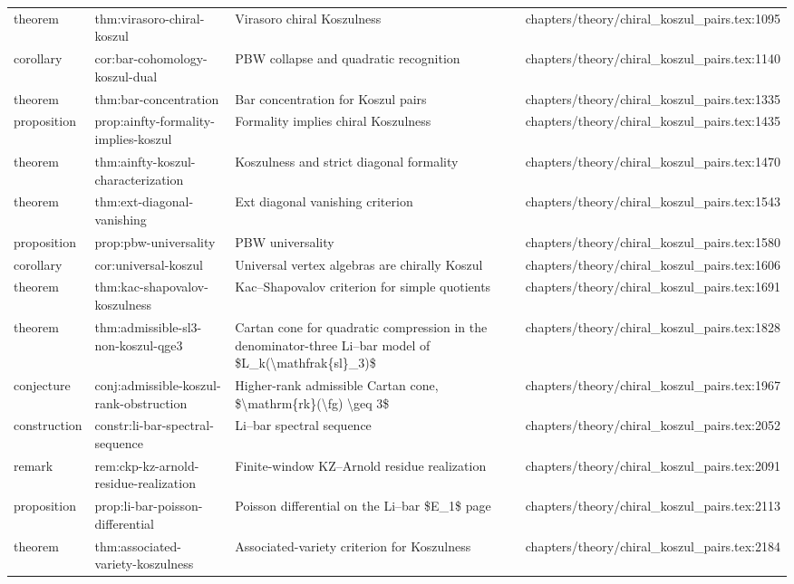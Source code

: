 \documentclass[11pt]{article}
\begin{document}
\begin{longtable}{L{0.10\textwidth}L{0.26\textwidth}L{0.42\textwidth}L{0.22\textwidth}}
theorem & thm:virasoro-chiral-koszul & Virasoro chiral Koszulness & chapters/theory/chiral\_koszul\_pairs.tex:1095\\
corollary & cor:bar-cohomology-koszul-dual & PBW collapse and quadratic recognition & chapters/theory/chiral\_koszul\_pairs.tex:1140\\
theorem & thm:bar-concentration & Bar concentration for Koszul pairs & chapters/theory/chiral\_koszul\_pairs.tex:1335\\
proposition & prop:ainfty-formality-implies-koszul & Formality implies chiral Koszulness & chapters/theory/chiral\_koszul\_pairs.tex:1435\\
theorem & thm:ainfty-koszul-characterization & Koszulness and strict diagonal formality & chapters/theory/chiral\_koszul\_pairs.tex:1470\\
theorem & thm:ext-diagonal-vanishing & Ext diagonal vanishing criterion & chapters/theory/chiral\_koszul\_pairs.tex:1543\\
proposition & prop:pbw-universality & PBW universality & chapters/theory/chiral\_koszul\_pairs.tex:1580\\
corollary & cor:universal-koszul & Universal vertex algebras are chirally Koszul & chapters/theory/chiral\_koszul\_pairs.tex:1606\\
theorem & thm:kac-shapovalov-koszulness & Kac--Shapovalov criterion for simple quotients & chapters/theory/chiral\_koszul\_pairs.tex:1691\\
theorem & thm:admissible-sl3-non-koszul-qge3 & Cartan cone for quadratic compression in the denominator-three Li--bar model of \$L\_k(\textbackslash{}mathfrak\{sl\}\_3)\$ & chapters/theory/chiral\_koszul\_pairs.tex:1828\\
conjecture & conj:admissible-koszul-rank-obstruction & Higher-rank admissible Cartan cone, \$\textbackslash{}mathrm\{rk\}(\textbackslash{}fg) \textbackslash{}geq 3\$ & chapters/theory/chiral\_koszul\_pairs.tex:1967\\
construction & constr:li-bar-spectral-sequence & Li--bar spectral sequence & chapters/theory/chiral\_koszul\_pairs.tex:2052\\
remark & rem:ckp-kz-arnold-residue-realization & Finite-window KZ--Arnold residue realization & chapters/theory/chiral\_koszul\_pairs.tex:2091\\
proposition & prop:li-bar-poisson-differential & Poisson differential on the Li--bar \$E\_1\$ page & chapters/theory/chiral\_koszul\_pairs.tex:2113\\
theorem & thm:associated-variety-koszulness & Associated-variety criterion for Koszulness & chapters/theory/chiral\_koszul\_pairs.tex:2184\\

\end{longtable}
\end{document}
